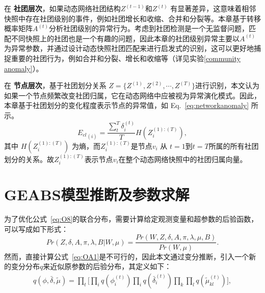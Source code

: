 在 \textbf{社团层次}，如果动态网络社团结构$Z^{(t-1)}$和$Z^{(t)}$ 有显著差异，这意味着相邻快照中存在社团级别的事件，例如社团增长和收缩、合并和分裂等。本章基于转移概率矩阵$A^{(t)}$分析社团级别的异常行为。考虑到社团检测是一个无监督问题，匹配不同快照上的社团也是一个有趣的问题，因此本章的社团级别异常主要以$A^{(t)}$为异常参数，并通过设计动态快照社团匹配来进行启发式的识别，这可以更好地捕捉重要的社团行为，例如合并和分裂、增长和收缩等（详见实验\ref{community anomaly}）。

在 \textbf{节点层次}，基于社团划分关系 $Z = \{ Z^{(1)}, Z^{(2)}, \cdots, Z^{(T)} \}$进行识别，本文认为如果一个节点频繁改变社团归属，它在动态网络中应被视为异常演化模式。因此，本章基于社团划分的变化程度表示节点的异常值，如 Eq.~\ref{eq:networkanomaly} 所示。
\begin{equation}
    {E_{cl}}_{(i)} = \frac{\sum_t^T \delta_i^{(t)}}{T} H(Z_i^{(1):(T)}),
\label{eq:networkanomaly}
\end{equation}
其中 $H(Z_i^{(1):(T)})$ 为熵，而$Z_i^{(1):(T)}$是节点$v_i$ 从 $t=1$到$t=T$所属的所有社团划分的关系。故$Z_i^{(1):(T)}$表示节点$v_i$在整个动态网络快照中的社团归属向量。


\section{GEABS模型推断及参数求解}
\label{sec4:inference}
为了优化公式~\ref{eq:O8}的联合分布，需要计算给定观测变量和超参数的后验函数，可以写成如下形式：
\begin{equation}
Pr(Z,\delta, A, \pi, \lambda, B | W, \mu) =
\frac{Pr(W, Z,\delta, A, \pi, \lambda, \mu, B)}{Pr( W, \mu)}.
\label{eq:OA1}
\end{equation}
然而，直接计算公式~\ref{eq:OA1}是不可行的，因此本文通过变分推断，引入一个新的变分分布$q$来近似原参数的后验分布，其定义如下：
\begin{equation}
\begin{split}
q(\phi,\bar{\delta}, \tilde{\mu}) = \prod_t \Big[ \prod_i q(\phi_i^{(t)}) \prod_i q(\bar{\delta}_i^{(t)}) \prod_k \prod_l q(\tilde{\mu}_{kl}^{(t)}) \Big],
\end{split}
\label{qfunc}
\end{equation}


